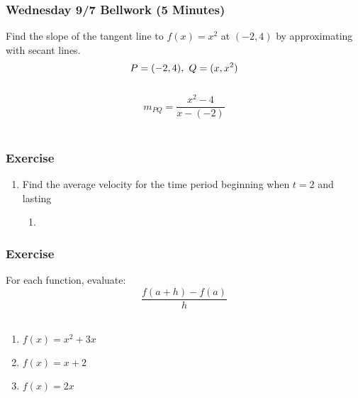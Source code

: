 \documentclass[12pt]{beamer}
\begin{document}
\begin{frame}
	\frametitle{Wednesday 9/7 Bellwork (5 Minutes)}
	\vspace*{\fill}
	\initclock
	Find the slope of the tangent line to $f(x)=x^2$ at $(-2,4)$ by approximating with secant lines.\\
	\[P = (-2, 4),\hspace{0.125cm}Q = (x, x^2)\]\\
	\[m_{PQ}=\frac{x^2-4}{x-(-2)}\]\\
	\vspace*{\fill}
	\vspace*{\fill}
	\vspace*{\fill}
	\vspace*{\fill}
	\vspace*{\fill}
	\vspace*{\fill}
	\crono
\end{frame}
\begin{frame}
	\frametitle{Exercise}
	\vspace*{\fill}
	\vspace*{\fill}
	\initclock
	\begin{enumerate}
		\item Find the average velocity for the time period beginning when $t=2$ and lasting \begin{multicols}{3}
			\begin{enumerate}
				\item 
			\end{enumerate}
		\end{multicols}
	\end{enumerate}
	\vspace*{\fill}
	\vspace*{\fill}
	\vspace*{\fill}
	\vspace*{\fill}
	\crono
\end{frame}
\begin{frame}
	\frametitle{Exercise}
	\vspace*{\fill}
	\vspace*{\fill}
	\initclock
	For each function, evaluate: \[\frac{f(a+h)-f(a)}{h}\]\\
	\begin{enumerate}
		\item $f(x) = x^2 + 3x$
		      \vspace*{\fill}
		\item $f(x) = x + 2$
		      \vspace*{\fill}
		\item $f(x) = 2x$
	\end{enumerate}
	\vspace*{\fill}
	\vspace*{\fill}
	\vspace*{\fill}
	\vspace*{\fill}
	\crono
\end{frame}
\end{document}
